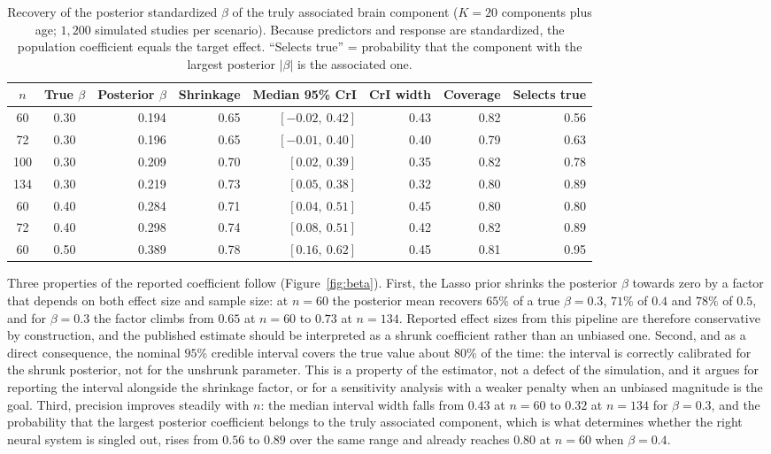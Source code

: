 \documentclass[11pt,a4paper]{article}
\begin{document}
\begin{table}[H]
\centering\small
\caption{Recovery of the posterior standardized $\beta$ of the truly associated brain component ($K=20$ components plus age; $1{,}200$ simulated studies per scenario). Because predictors and response are standardized, the population coefficient equals the target effect. ``Selects true'' = probability that the component with the largest posterior $|\beta|$ is the associated one.}
\label{tab:beta}
\begin{tabular}{ccrrrrrr}
\toprule
$n$ & True $\beta$ & Posterior $\beta$ & Shrinkage & Median 95\% CrI & CrI width & Coverage & Selects true\\
\midrule
\rowcolor{RowGrey}
60 & 0.30 & 0.194 & 0.65 & $[-0.02,\ 0.42]$ & 0.43 & 0.82 & 0.56\\
72 & 0.30 & 0.196 & 0.65 & $[-0.01,\ 0.40]$ & 0.40 & 0.79 & 0.63\\
100 & 0.30 & 0.209 & 0.70 & $[0.02,\ 0.39]$ & 0.35 & 0.82 & 0.78\\
134 & 0.30 & 0.219 & 0.73 & $[0.05,\ 0.38]$ & 0.32 & 0.80 & 0.89\\
\rowcolor{RowGrey}
60 & 0.40 & 0.284 & 0.71 & $[0.04,\ 0.51]$ & 0.45 & 0.80 & 0.80\\
\rowcolor{RowGrey}
72 & 0.40 & 0.298 & 0.74 & $[0.08,\ 0.51]$ & 0.42 & 0.82 & 0.89\\
60 & 0.50 & 0.389 & 0.78 & $[0.16,\ 0.62]$ & 0.45 & 0.81 & 0.95\\
\bottomrule
\end{tabular}
\end{table}

Three properties of the reported coefficient follow (Figure~\ref{fig:beta}). First, the Lasso prior shrinks the posterior $\beta$ towards zero by a factor that depends on both effect size and sample size: at $n=60$ the posterior mean recovers $65\%$ of a true $\beta=0.3$, $71\%$ of $0.4$ and $78\%$ of $0.5$, and for $\beta=0.3$ the factor climbs from $0.65$ at $n=60$ to $0.73$ at $n=134$. Reported effect sizes from this pipeline are therefore conservative by construction, and the published estimate should be interpreted as a shrunk coefficient rather than an unbiased one. Second, and as a direct consequence, the nominal $95\%$ credible interval covers the true value about $80\%$ of the time: the interval is correctly calibrated for the shrunk posterior, not for the unshrunk parameter. This is a property of the estimator, not a defect of the simulation, and it argues for reporting the interval alongside the shrinkage factor, or for a sensitivity analysis with a weaker penalty when an unbiased magnitude is the goal. Third, precision improves steadily with $n$: the median interval width falls from $0.43$ at $n=60$ to $0.32$ at $n=134$ for $\beta=0.3$, and the probability that the largest posterior coefficient belongs to the truly associated component, which is what determines whether the right neural system is singled out, rises from $0.56$ to $0.89$ over the same range and already reaches $0.80$ at $n=60$ when $\beta=0.4$.
\end{document}
